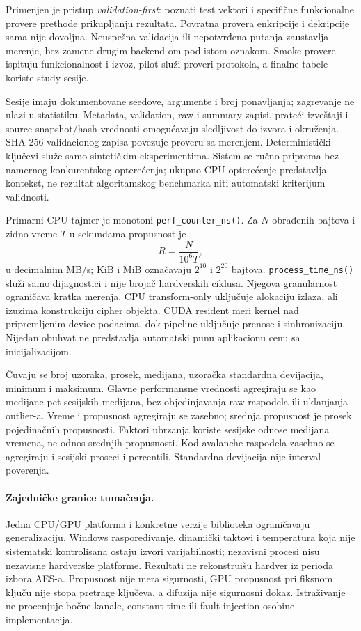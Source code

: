 Primenjen je pristup \emph{validation-first}: poznati test vektori i
specifične funkcionalne provere prethode prikupljanju rezultata.
Povratna provera enkripcije i dekripcije sama nije dovoljna. Neuspešna
validacija ili nepotvrđena putanja zaustavlja merenje, bez zamene drugim
backend-om pod istom oznakom. Smoke provere ispituju funkcionalnost i
izvoz, pilot služi proveri protokola, a finalne tabele koriste study sesije.

Sesije imaju dokumentovane seedove, argumente i broj ponavljanja;
zagrevanje ne ulazi u statistiku. Metadata, validation, raw i summary
zapisi, prateći izveštaji i source snapshot/hash vrednosti omogućavaju
sledljivost do izvora i okruženja. SHA-256 validacionog zapisa povezuje
proveru sa merenjem. Deterministički ključevi služe samo sintetičkim
eksperimentima. Sistem se ručno priprema bez namernog konkurentskog
opterećenja; ukupno CPU opterećenje predstavlja kontekst, ne rezultat
algoritamskog benchmarka niti automatski kriterijum validnosti.

Primarni CPU tajmer je monotoni \texttt{perf\_counter\_ns()}.
Za $N$ obrađenih bajtova i zidno vreme $T$ u sekundama propusnost je
\begin{equation}
R = \frac{N}{10^6 T},
\label{eq:eksperiment-propusnost}
\end{equation}
u decimalnim MB/s; KiB i MiB označavaju $2^{10}$ i $2^{20}$ bajtova.
\texttt{process\_time\_ns()} služi samo dijagnostici i nije brojač
hardverskih ciklusa. Njegova granularnost ograničava kratka merenja.
CPU transform-only uključuje alokaciju izlaza, ali izuzima konstrukciju
cipher objekta. CUDA resident meri kernel nad pripremljenim device
podacima, dok pipeline uključuje prenose i sinhronizaciju. Nijedan
obuhvat ne predstavlja automatski punu aplikacionu cenu sa inicijalizacijom.

Čuvaju se broj uzoraka, prosek, medijana, uzoračka standardna devijacija,
minimum i maksimum. Glavne performansne vrednosti agregiraju se kao
medijane pet sesijskih medijana, bez objedinjavanja raw raspodela ili
uklanjanja outlier-a. Vreme i propusnost agregiraju se zasebno; srednja
propusnost je prosek pojedinačnih propusnosti. Faktori ubrzanja koriste
sesijske odnose medijana vremena, ne odnos srednjih propusnosti.
Kod avalanche raspodela zasebno se agregiraju i sesijski proseci i
percentili. Standardna devijacija nije interval poverenja.

\paragraph{Zajedničke granice tumačenja.}
\label{sec:eksperimentalna-ogranicenja}
Jedna CPU/GPU platforma i konkretne verzije biblioteka ograničavaju
generalizaciju. Windows raspoređivanje, dinamički taktovi i temperatura
koja nije sistematski kontrolisana ostaju izvori varijabilnosti;
nezavisni procesi nisu nezavisne hardverske platforme. Rezultati ne
rekonstruišu hardver iz perioda izbora AES-a. Propusnost nije mera
sigurnosti, GPU propusnost pri fiksnom ključu nije stopa pretrage ključeva, a
difuzija nije sigurnosni dokaz. Istraživanje ne procenjuje bočne kanale,
constant-time ili fault-injection osobine implementacija.

